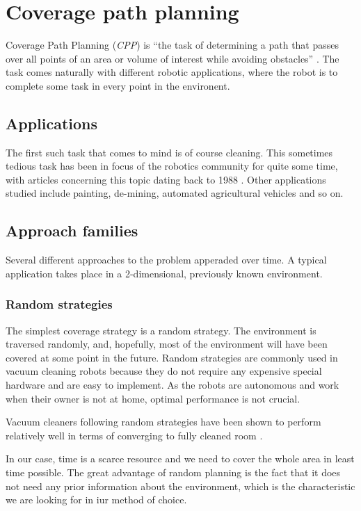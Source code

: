 \documentclass[buriama8_dp.tex]{subfiles}
\begin{document}
\chapter{Coverage path planning}
\label{chap:cpp}

Coverage Path Planning (\textit{CPP}) is ``the task of determining a path that passes over all points of an area or volume of interest while avoiding obstacles'' \cite{survey13}. The task comes naturally with different robotic applications, where the robot is to complete some task in every point in the environent.

\section{Applications}
The first such task that comes to mind is of course cleaning. This sometimes tedious task has been in focus of the robotics community for quite some time, with articles concerning this topic dating back to 1988 \cite{cleaning88}. Other applications studied include painting, de-mining, automated agricultural vehicles and so on.

\section{Approach families}

Several different approaches to the problem apperaded over time. A typical application takes place in a 2-dimensional, previously known environment.


\subsection{Random strategies}
\label{subsec:random_cpp}
The simplest coverage strategy is a random strategy. The environment is traversed randomly, and, hopefully, most of the environment will have been covered at some point in the future. Random strategies are commonly used in vacuum cleaning robots because they do not require any expensive special hardware and are easy to implement. As the robots are autonomous and work when their owner is not at home, optimal performance is not crucial.

Vacuum cleaners following random strategies have been shown to perform relatively well in terms of converging to fully cleaned room \cite{randomcover}.

In our case, time is a scarce resource and we need to cover the whole area in least time possible. The great advantage of random planning is the fact that it does not need any prior information about the environment, which is the characteristic we are looking for in iur method of choice.
\end{document}

